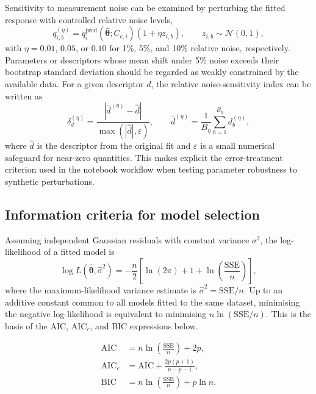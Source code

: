 \documentclass[journal=jacsat,manuscript=article]{achemso}
\begin{document}
Sensitivity to measurement noise can be examined by perturbing the
fitted response with controlled relative noise levels,
\begin{equation}
	q_{i,b}^{(\eta)}
	=
	q_i^{\mathrm{pred}}(\hat{\boldsymbol{\theta}}; C_{e,i})
	\left(1 + \eta z_{i,b}\right),
	\qquad
	z_{i,b} \sim \mathcal{N}(0,1),
	\label{eq:si_noise_test}
\end{equation}
with $\eta = 0.01$, $0.05$, or $0.10$ for 1\%, 5\%, and 10\% relative
noise, respectively. Parameters or descriptors whose mean shift under
5\% noise exceeds their bootstrap standard deviation should be regarded
as weakly constrained by the available data.
For a given descriptor $d$, the relative noise-sensitivity index can be
written as
\begin{equation}
	\delta_d^{(\eta)}
	=
	\frac{
	\left|
	\bar{d}^{(\eta)} - \hat{d}
	\right|
	}{
	\max\!\left(|\hat{d}|,\varepsilon\right)
	},
	\qquad
	\bar{d}^{(\eta)} = \frac{1}{B_{\eta}}\sum_{b=1}^{B_{\eta}} d_b^{(\eta)},
	\label{eq:si_noise_shift}
\end{equation}
where $\hat{d}$ is the descriptor from the original fit and
$\varepsilon$ is a small numerical safeguard for near-zero quantities.
This makes explicit the error-treatment criterion used in the notebook
workflow when testing parameter robustness to synthetic perturbations.

\subsection{Information criteria for model selection}
\label{sec:si_information_criteria}

Assuming independent Gaussian residuals with constant variance
$\sigma^2$, the log-likelihood of a fitted model is
\begin{equation}
	\log L(\hat{\boldsymbol{\theta}}, \hat{\sigma}^2)
	=
	-\frac{n}{2}
	\left[
	\ln(2\pi)
	+ 1
	+ \ln\!\left(\frac{\mathrm{SSE}}{n}\right)
	\right],
	\label{eq:si_loglik}
\end{equation}
where the maximum-likelihood variance estimate is
$\hat{\sigma}^2 = \mathrm{SSE}/n$. Up to an additive constant common to
all models fitted to the same dataset, minimising the negative
log-likelihood is equivalent to minimising
$n\ln(\mathrm{SSE}/n)$. This is the basis of the AIC, AIC$_c$, and BIC
expressions below.

\begin{align}
	\text{AIC}   &= n\ln\!\left(\frac{\mathrm{SSE}}{n}\right) + 2p,
	\label{eq:si_AIC} \\[4pt]
	\text{AIC}_c &= \text{AIC} + \frac{2p(p+1)}{n-p-1},
	\label{eq:si_AICc} \\[4pt]
	\text{BIC}   &= n\ln\!\left(\frac{\mathrm{SSE}}{n}\right) + p\ln n.
	\label{eq:si_BIC}
\end{align}
\end{document}
